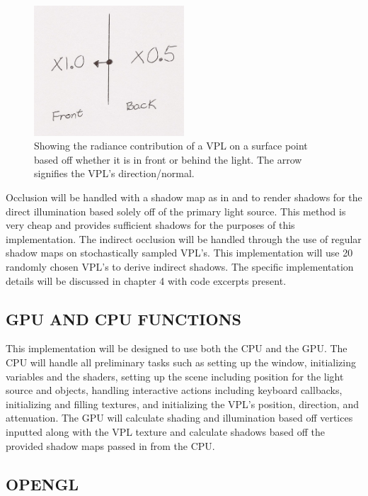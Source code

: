 \begin{figure}[h!]
  \centering
    \includegraphics[width=0.5\textwidth]{Figure36.jpg}
  \caption{Showing the radiance contribution of a VPL on a surface point based off whether it is in front or behind the light.  The arrow signifies the VPL's direction/normal.}
	\label{fig:3.6}
\end{figure}

Occlusion will be handled with a shadow map as in \cite{Williams1978} and \cite{Reeves1987} to render shadows for the direct illumination based solely off of the primary light source.  This method is very cheap and provides sufficient shadows for the purposes of this implementation.  The indirect occlusion will be handled through the use of regular shadow maps on stochastically sampled VPL's.  This implementation will use 20 randomly chosen VPL's to derive indirect shadows.  The specific implementation details will be discussed in chapter 4 with code excerpts present.

\subsection{GPU AND CPU FUNCTIONS}

This implementation will be designed to use both the CPU and the GPU.  The CPU will handle all preliminary tasks such as setting up the window, initializing variables and the shaders, setting up the scene including position for the light source and objects, handling interactive actions including keyboard callbacks, initializing and filling textures, and initializing the VPL's position, direction, and attenuation.  The GPU will calculate shading and illumination based off vertices inputted along with the VPL texture and calculate shadows based off the provided shadow maps passed in from the CPU.

\subsection{OPENGL}

